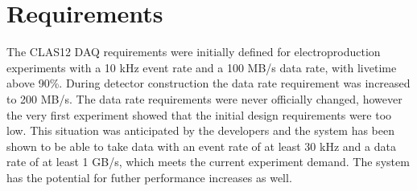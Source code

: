 \section{Requirements}

The CLAS12 DAQ requirements were initially defined for electroproduction experiments with a 10 kHz event rate and a 100 MB/s data rate, with livetime above 90\%. During detector construction the data rate requirement was increased to 200 MB/s. The data rate requirements were never officially changed, however the very first experiment showed that the initial design requirements were too low. This situation was anticipated by the developers and the system has been shown to be able to take data with an event rate of at least 30 kHz and a data rate of at least 1 GB/s, which meets the current experiment demand. The system has the potential for futher performance increases as well.

